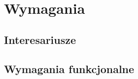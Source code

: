 \chapter{Wymagania}\label{ch:wymagania}


\section{Interesariusze}\label{sec:interesariusze}

%
%

\section{Wymagania funkcjonalne}\label{sec:wymagania-funkcjonalne}

